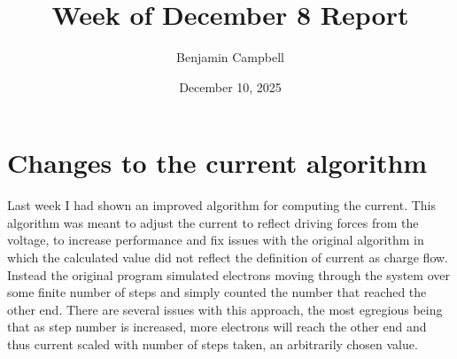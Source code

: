 \documentclass{article}
\title{Week of December 8 Report}
\author{Benjamin Campbell}
\date{December 10, 2025}
\theoremstyle{definition} %
\begin{document}

\newcommand{\Teff}{T_{\text{eff}}}
\newcommand{\Ueff}{U_{\text{eff}}}
\newcommand{\Veff}{V_{\text{eff}}}


\newcommand{\Per}{\text{Per}}

\maketitle


\newpage

\section{Changes to the current algorithm}

Last week I had shown an improved algorithm for computing the current. This algorithm was meant to adjust the current to reflect driving forces from the voltage, to increase performance and fix issues with the original algorithm in which the calculated value did not reflect the definition of current as charge flow. Instead the original program simulated electrons moving through the system over some finite number of steps and simply counted the number that reached the other end. There are several issues with this approach, the most egregious being that as step number is increased, more electrons will reach the other end and thus current scaled with number of steps taken, an arbitrarily chosen value.
\end{document}
